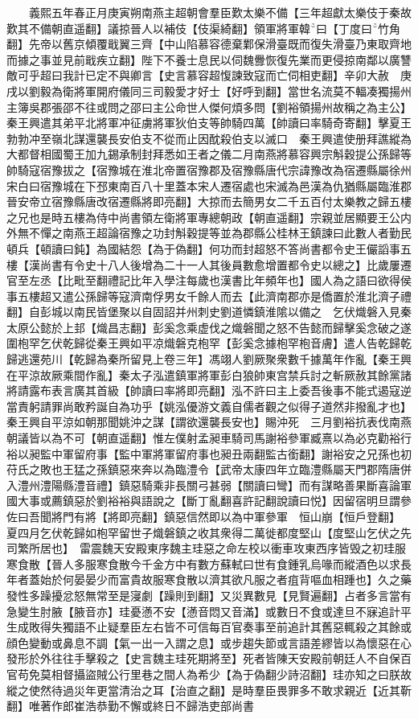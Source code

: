 　　義熙五年春正月庚寅朔南燕主超朝會羣臣歎太樂不備【三年超獻太樂伎于秦故歎其不備朝直遥翻】議掠晉人以補伎【伎渠綺翻】領軍將軍韓曰【丁度曰竹角翻】先帝以舊京傾覆戢翼三齊【中山陷慕容德棄鄴保滑臺既而復失滑臺乃東取齊地而據之事並見前戢疾立翻】陛下不養士息民以伺魏釁恢復先業而更侵掠南鄰以廣讐敵可乎超曰我計已定不與卿言【史言慕容超愎諫致寇而亡伺相吏翻】辛卯大赦　庚戌以劉毅為衛將軍開府儀同三司毅愛才好士【好呼到翻】當世名流莫不輻凑獨揚州主簿吳郡張邵不往或問之邵曰主公命世人傑何煩多問【劉裕領揚州故稱之為主公】　秦王興遣其弟平北將軍冲征虜將軍狄伯支等帥騎四萬【帥讀曰率騎奇寄翻】擊夏王勃勃冲至嶺北謀還襲長安伯支不從而止因酖殺伯支以滅口　秦王興遣使册拜譙縱為大都督相國蜀王加九錫承制封拜悉如王者之儀二月南燕將慕容興宗斛穀提公孫歸等帥騎寇宿豫拔之【宿豫城在淮北帝置宿豫郡及宿豫縣唐代宗諱豫改為宿遷縣屬徐州宋白曰宿豫城在下邳東南百八十里蓋本宋人遷宿處也宋滅為邑漢為仇猶縣屬臨淮郡晉安帝立宿豫縣唐改宿遷縣將即亮翻】大掠而去簡男女二千五百付太樂教之歸五樓之兄也是時五樓為侍中尚書領左衛將軍專總朝政【朝直遥翻】宗親並居顯要王公内外無不憚之南燕王超論宿豫之功封斛穀提等並為郡縣公桂林王鎮諫曰此數人者勤民頓兵【頓讀曰鈍】為國結怨【為于偽翻】何功而封超怒不答尚書都令史王儼謟事五樓【漢尚書有令史十八人後增為二十一人其後員數愈增置都令史以總之】比歲屢遷官至左丞【比毗至翻禮記比年入學注每歲也漢書比年頻年也】國人為之語曰欲得侯事五樓超又遣公孫歸等寇濟南俘男女千餘人而去【此濟南郡亦是僑置於淮北濟子禮翻】自彭城以南民皆堡聚以自固詔并州刺史劉道憐鎮淮隂以備之　乞伏熾磐入見秦太原公懿於上邽【熾昌志翻】彭奚念乘虚伐之熾磐聞之怒不告懿而歸擊奚念破之遂圍枹罕乞伏乾歸從秦王興如平凉熾磐克枹罕【彭奚念據枹罕枹音膚】遣人告乾歸乾歸逃還苑川【乾歸為秦所留見上卷三年】馮翊人劉厥聚衆數千據萬年作亂【秦王興在平涼故厥乘間作亂】秦太子泓遣鎮軍將軍彭白狼帥東宫禁兵討之斬厥赦其餘黨諸將請露布表言廣其首級【帥讀曰率將即亮翻】泓不許曰主上委吾後事不能式遏寇逆當責躬請罪尚敢矜誕自為功乎【姚泓優游文義自儒者觀之似得子道然非撥亂才也】秦王興自平涼如朝那聞姚沖之謀【謂欲還襲長安也】賜沖死　三月劉裕抗表伐南燕朝議皆以為不可【朝直遥翻】惟左僕射孟昶車騎司馬謝裕參軍臧熹以為必克勸裕行裕以昶監中軍留府事【監中軍將軍留府事也昶丑兩翻監古銜翻】謝裕安之兄孫也初苻氏之敗也王猛之孫鎮惡來奔以為臨澧令【武帝太康四年立臨澧縣屬天門郡隋唐併入澧州澧陽縣澧音禮】鎮惡騎乘非長關弓甚弱【關讀曰彎】而有謀略善果斷喜論軍國大事或薦鎮惡於劉裕裕與語說之【斷丁亂翻喜許記翻說讀曰悦】因留宿明旦謂參佐曰吾聞將門有將【將即亮翻】鎮惡信然即以為中軍參軍　恒山崩【恒戶登翻】　夏四月乞伏乾歸如枹罕留世子熾磐鎮之收其衆得二萬徙都度堅山【度堅山乞伏之先司繁所居也】　雷震魏天安殿東序魏主珪惡之命左校以衝車攻東西序皆毁之初珪服寒食散【晉人多服寒食散今千金方中有數方蘇軾曰世有食鍾乳烏喙而縱酒色以求長年者蓋始於何晏晏少而富貴故服寒食散以濟其欲凡服之者疽背嘔血相踵也】久之藥發性多躁擾忿怒無常至是寖劇【躁則到翻】又災異數見【見賢遍翻】占者多言當有急變生肘腋【腋音亦】珪憂懣不安【懣音悶又音滿】或數日不食或達旦不寐追計平生成敗得失獨語不止疑羣臣左右皆不可信每百官奏事至前追計其舊惡輒殺之其餘或顔色變動或鼻息不調【氣一出一入謂之息】或步趨失節或言語差繆皆以為懷惡在心發形於外往往手擊殺之【史言魏主珪死期將至】死者皆陳天安殿前朝廷人不自保百官苟免莫相督攝盜賊公行里巷之間人為希少【為于偽翻少詩沼翻】珪亦知之曰朕故縱之使然待過災年更當清治之耳【治直之翻】是時羣臣畏罪多不敢求親近【近其靳翻】唯著作郎崔浩恭勤不懈或終日不歸浩吏部尚書